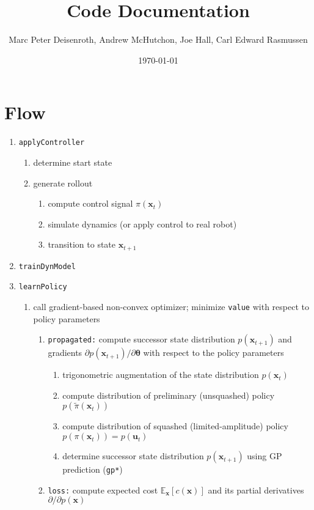 \documentclass{article}
\title{Code Documentation}
\author{Marc Peter Deisenroth, Andrew McHutchon, Joe Hall, Carl Edward
  Rasmussen}
\date{\today}
\renewcommand{\vec}[1]{\boldsymbol{#1}}  %
\newcommand{\E}{\mathds{E}}
\begin{document}
\maketitle

\section{Flow}

\begin{enumerate}
\item \texttt{applyController}
\begin{enumerate}
\item determine start state
\item generate rollout
\begin{enumerate}
\item compute control signal $\pi(\vec x_t)$
\item simulate dynamics (or apply control to real robot)
\item transition to state $\vec x_{t+1}$
\end{enumerate}
\end{enumerate}
\item \texttt{trainDynModel}
\item \texttt{learnPolicy}
\begin{enumerate}
\item call gradient-based non-convex optimizer; minimize
  \texttt{value} with respect to policy parameters
\begin{enumerate}
\item \texttt{propagated:} compute successor state distribution
  $p(\vec x_{t+1})$ and gradients $\partial p(\vec
  x_{t+1})/\partial\vec\theta$ with respect to the policy parameters
\begin{enumerate}
\item trigonometric augmentation of the state distribution $p(\vec
  x_t)$
\item compute distribution of preliminary (unsquashed) policy
  $p(\tilde\pi(\vec x_t))$
\item compute distribution of squashed (limited-amplitude) policy
  $p(\pi(\vec x_t))=p(\vec u_t)$
\item determine successor state distribution $p(\vec x_{t+1})$ using
  GP prediction (\texttt{gp*})
\end{enumerate}
\item \texttt{loss:} compute expected cost $\E_{\vec x}[c(\vec x)]$
  and its partial derivatives $\partial/\partial p(\vec x)$
\end{enumerate}
\end{enumerate}
\end{enumerate}
\end{document}
